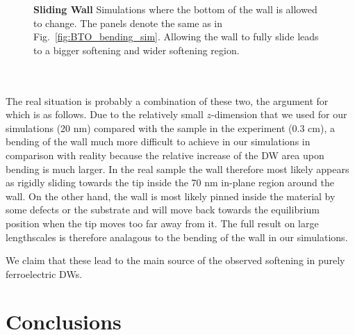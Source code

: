 \begin{figure}
	\caption{\label{fig:BTO_sliding_sim}{\bf Sliding Wall} Simulations where the bottom of the wall is allowed to change. The panels denote the same as in Fig.~\ref{fig:BTO_bending_sim}. Allowing the wall to fully slide leads to a bigger softening and wider softening region.}
\end{figure}
\\\\
The real situation is probably a combination of these two, the argument for which is as follows.
Due to the relatively small $z$-dimension that we used for our simulations (20 nm) compared with the sample in the experiment (0.3 cm), a bending of the wall much more difficult to achieve in our simulations in comparison with reality because the relative increase of the DW area upon bending is much larger. 
In the real sample the wall therefore most likely appears as rigidly sliding towards the tip inside the 70 nm in-plane region around the wall.
On the other hand, the wall is most likely pinned inside the material by some defects or the substrate and will move back towards the equilibrium position when the tip moves too far away from it. The full result on large lengthscales is therefore analagous to the bending of the wall in our simulations.

We claim that these lead to the main source of the observed softening in purely ferroelectric DWs.
\section{Conclusions}

